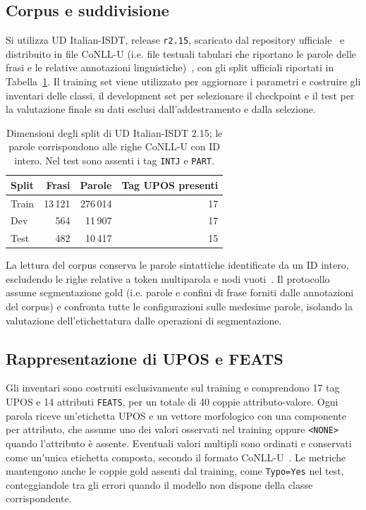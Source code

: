 \documentclass[12pt,a4paper]{report}
\begin{document}
\subsection{Corpus e suddivisione}
\label{subsec:method-data-splits}

Si utilizza UD Italian-ISDT, release \texttt{r2.15}, scaricato dal repository ufficiale~\cite{isdt} e distribuito in file CoNLL-U (i.e. file testuali tabulari che riportano le parole delle frasi e le relative annotazioni linguistiche)~\cite{conllu}, con gli split ufficiali riportati in Tabella~\ref{tab:data}. Il training set viene utilizzato per aggiornare i parametri e costruire gli inventari delle classi, il development set per selezionare il checkpoint e il test per la valutazione finale su dati esclusi dall'addestramento e dalla selezione.

\begin{table}[htbp]
\centering
\begin{tabular}{lrrr}
\toprule
Split & Frasi & Parole & Tag UPOS presenti\\
\midrule
Train & 13\,121 & 276\,014 & 17\\
Dev & 564 & 11\,907 & 17\\
Test & 482 & 10\,417 & 15\\
\bottomrule
\end{tabular}
\caption{Dimensioni degli split di UD Italian-ISDT 2.15; le parole corrispondono alle righe CoNLL-U con ID intero. Nel test sono assenti i tag \texttt{INTJ} e \texttt{PART}.}
\label{tab:data}
\end{table}

La lettura del corpus conserva le parole sintattiche identificate da un ID intero, escludendo le righe relative a token multiparola e nodi vuoti~\cite{conllu}. Il protocollo assume segmentazione gold (i.e. parole e confini di frase forniti dalle annotazioni del corpus) e confronta tutte le configurazioni sulle medesime parole, isolando la valutazione dell'etichettatura dalle operazioni di segmentazione.

\subsection{Rappresentazione di UPOS e FEATS}
\label{subsec:method-label-representation}

Gli inventari sono costruiti esclusivamente sul training e comprendono 17 tag UPOS e 14 attributi \texttt{FEATS}, per un totale di 40 coppie attributo-valore. Ogni parola riceve un'etichetta UPOS e un vettore morfologico con una componente per attributo, che assume uno dei valori osservati nel training oppure \texttt{<NONE>} quando l'attributo è assente. Eventuali valori multipli sono ordinati e conservati come un'unica etichetta composta, secondo il formato CoNLL-U~\cite{conllu}. Le metriche mantengono anche le coppie gold assenti dal training, come \texttt{Typo=Yes} nel test, conteggiandole tra gli errori quando il modello non dispone della classe corrispondente.
\end{document}

